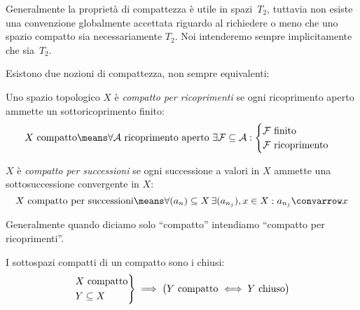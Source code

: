
Generalmente la proprietà di compattezza è utile in spazi~$T_2$,
tuttavia non esiste una convenzione globalmente accettata
riguardo al richiedere o meno che uno spazio compatto sia necessariamente $T_2$.
Noi intenderemo sempre implicitamente che sia~$T_2$.

Esistono due nozioni di compattezza, non sempre equivalenti:

\begin{defn}
 Uno spazio topologico $X$ è \emph{compatto per ricoprimenti}
 se ogni ricoprimento aperto ammette un sottoricoprimento finito:
 \[\text{$X$ compatto}\means
 \forall\mathcal A\text{ ricoprimento aperto }
 \exists\mathcal F\subseteq\mathcal A:\begin{cases}
  \mathcal F\text{ finito} \\
  \mathcal F\text{ ricoprimento}
 \end{cases}\]
\end{defn}

\begin{defn}
 $X$ è \emph{compatto per successioni}
 se ogni successione a valori in $X$ ammette una sottosuccessione convergente in $X$:
 \[\text{$X$ compatto per successioni}\means
 \forall(a_n)\subseteq X\,\exists (a_{n_j}),x\in X:a_{n_j}\convarrow x\]
\end{defn}

Generalmente quando diciamo solo ``compatto'' intendiamo ``compatto per ricoprimenti''.

\begin{prop}
 I sottospazi compatti di un compatto sono i chiusi:
 \[\begin{rcases}
  \text{$X$ compatto} \\
  Y\subseteq X
 \end{rcases}\implies
 \big(\text{$Y$ compatto $\iff Y$ chiuso}\big)\]
\end{prop}

